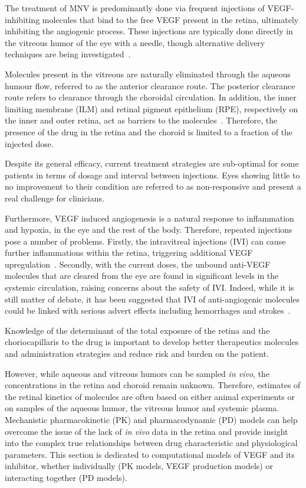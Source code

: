 \documentclass[12pt,a4paper]{journal}
\begin{document}
The treatment of MNV is predominantly done via frequent injections of VEGF-inhibiting molecules that bind to the free VEGF present in the retina, ultimately inhibiting the angiogenic process.
These injections are typically done directly in the vitreous humor of the eye with a needle, though alternative delivery techniques are being investigated~\cite{Kim_2021}.

Molecules present in the vitreous are naturally eliminated through the aqueous humour flow, referred to as the anterior clearance route.
The posterior clearance route refers to clearance through the choroidal circulation.
In addition, the inner limiting membrane (ILM) and retinal pigment epithelium (RPE), respectively on the inner and outer retina, act as barriers to the molecules~\cite{Park_2015}.
Therefore, the presence of the drug in the retina and the choroid is limited to a fraction of the injected dose. 

Despite its general efficacy, current treatment strategies are sub-optimal for some patients in terms of dosage and interval between injections.
Eyes showing little to no improvement to their condition are referred to as non-responsive and present a real challenge for clinicians.

Furthermore, VEGF induced angiogenesis is a natural response to inflammation and hypoxia, in the eye and the rest of the body. 
Therefore, repeated injections pose a number of problems.
Firstly, the intravitreal injections (IVI) can cause further inflammations within the retina, triggering additional VEGF upregulation~\cite{Iyer_2022}.
Secondly, with the current doses, the unbound anti-VEGF molecules that are cleared from the eye are found in significant levels in the systemic circulation, raising concerns about the safety of IVI.
Indeed, while it is still matter of debate, it has been suggested that IVI of anti-angiogenic molecules could be linked with serious advert effects including hemorrhages and strokes~\cite{Avery_2016, Kaiser_2019, Maloney_2021}.

Knowledge of the determinant of the total exposure of the retina and the choriocapillaris to the drug is important to develop better therapeutics molecules and administration strategies and reduce risk and burden on the patient.

However, while aqueous and vitreous humors can be sampled \textit{in vivo}, the concentrations in the retina and choroid remain unknown. 
Therefore, estimates of the retinal kinetics of molecules are often based on either animal experiments or on samples of the aqueous humor, the vitreous humor and systemic plasma.
Mechanistic pharmacokinetic (PK) and pharmacodynamic (PD) models can help overcome the issue of the lack of \textit{in vivo} data in the retina and provide insight into the complex true relationships between drug characteristic and physiological parameters.
This section is dedicated to computational models of VEGF and its inhibitor, whether individually (PK models, VEGF production models) or interacting together (PD models).
\end{document}
